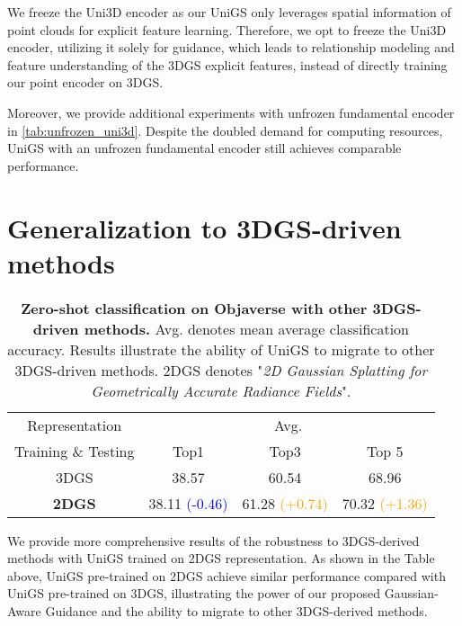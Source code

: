We freeze the Uni3D encoder as our UniGS only leverages spatial information of point clouds for explicit feature learning. Therefore, we opt to freeze the Uni3D encoder, utilizing it solely for guidance, which leads to relationship modeling and feature understanding of the 3DGS explicit features, instead of directly training our point encoder on 3DGS.

Moreover, we provide additional experiments with unfrozen fundamental encoder in \cref{tab:unfrozen_uni3d}. Despite the doubled demand for computing resources, UniGS with an unfrozen fundamental encoder still achieves comparable performance.


\section{Generalization to 3DGS-driven methods}

\begin{table*}[t]
		\centering
  \caption{\textbf{Zero-shot classification on Objaverse with other 3DGS-driven methods.} Avg. denotes mean average classification accuracy. Results illustrate the ability of UniGS to migrate to other 3DGS-driven methods. 2DGS denotes "\emph{2D Gaussian Splatting for Geometrically Accurate Radiance Fields}".
  }
  \vspace{-2mm}
  \addtolength{\tabcolsep}{5pt}
 \begin{tabular}{ c | c c c }
\toprule
Representation & \multicolumn{3}{c}{Avg.} \\
 Training \& Testing & Top1 & Top3 & Top 5 \\
 \midrule  \midrule
 3DGS & 38.57 & 60.54 & 68.96 \\
 \textbf{2DGS} & 38.11 \textcolor{blue}{(-0.46)} & 61.28 \textcolor{orange}{(+0.74)} & 70.32 \textcolor{orange}{(+1.36)}  \\
\bottomrule

\end{tabular}
  \label{tab:2dgs_classification}
  \vspace{-3mm}
\end{table*}

We provide more comprehensive results of the robustness to 3DGS-derived methods with UniGS trained on 2DGS representation. As shown in the Table above, UniGS pre-trained on 2DGS achieve similar performance compared with UniGS pre-trained on 3DGS, illustrating the power of our proposed Gaussian-Aware Guidance and the ability to migrate to other 3DGS-derived methods.

